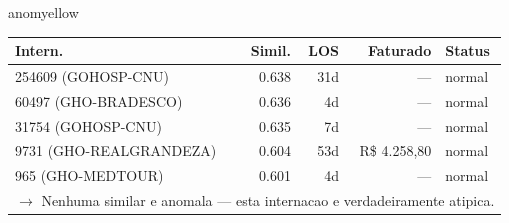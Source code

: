 \documentclass[a4paper,10pt]{article}
\begin{document}
\begin{anomalycard}[Internacao 124979 | GHO-PETROBRAS | MODERADO (z=2.09)]{anomyellow}
\begin{tabular}{l r r r l}\toprule\textbf{Intern.} & \textbf{Simil.} & \textbf{LOS} & \textbf{Faturado} & \textbf{Status} \\\midrule
254609 (GOHOSP-CNU) & 0.638 & 31d & --- & \textcolor{jcubeblue}{normal} \\
60497 (GHO-BRADESCO) & 0.636 & 4d & --- & \textcolor{jcubeblue}{normal} \\
31754 (GOHOSP-CNU) & 0.635 & 7d & --- & \textcolor{jcubeblue}{normal} \\
9731 (GHO-REALGRANDEZA) & 0.604 & 53d & R\$ 4.258,80 & \textcolor{jcubeblue}{normal} \\
965 (GHO-MEDTOUR) & 0.601 & 4d & --- & \textcolor{jcubeblue}{normal} \\
\multicolumn{5}{l}{\textcolor{jcubeblue}{\small $\rightarrow$ Nenhuma similar e anomala --- esta internacao e verdadeiramente atipica.}} \\
\bottomrule\end{tabular}


\end{anomalycard}

\newpage
\end{document}
